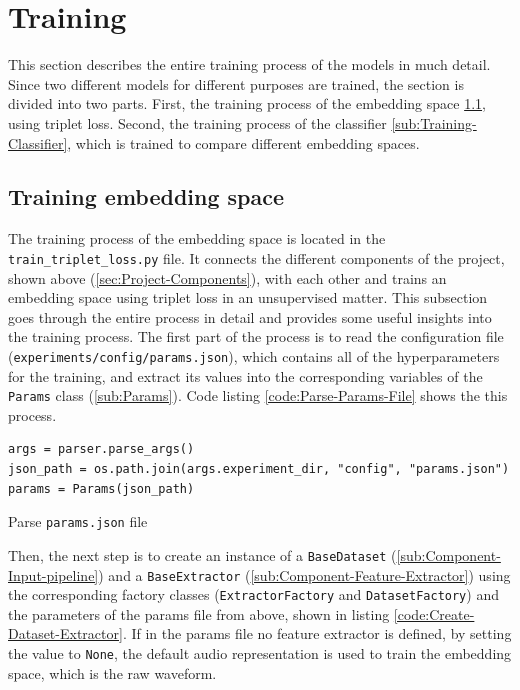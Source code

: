 \section{Training}
\label{sec:Training}
This section describes the entire training process of the models in much detail. Since two different models for different purposes are trained, the section is divided into two parts. First, the training process of the embedding space \ref{sub:Training-Embedding-Space}, using triplet loss. Second, the training process of the classifier \ref{sub:Training-Classifier}, which is trained to compare different embedding spaces.

\subsection{Training embedding space}
\label{sub:Training-Embedding-Space}
The training process of the embedding space is located in the \texttt{train\_triplet\_loss.py} file. It connects the different components of the project, shown above (\ref{sec:Project-Components}), with each other and trains an embedding space using triplet loss in an unsupervised matter. This subsection goes through the entire process in detail and provides some useful insights into the training process.
\newline
\newline
The first part of the process is to read the configuration file (\texttt{experiments/config/params.json}), which contains all of the hyperparameters for the training, and extract its values into the corresponding variables of the \texttt{Params} class (\ref{sub:Params}). Code listing \ref{code:Parse-Params-File} shows the this process.

\begin{code}[H]
\begin{verbatim}
args = parser.parse_args()
json_path = os.path.join(args.experiment_dir, "config", "params.json")
params = Params(json_path)
\end{verbatim}
\caption{Parse \texttt{params.json} file}
\label{code:Parse-Params-File}
\end{code}
\noindent
Then, the next step is to create an instance of a \texttt{BaseDataset} (\ref{sub:Component-Input-pipeline}) and a \texttt{BaseExtractor} (\ref{sub:Component-Feature-Extractor}) using the corresponding factory classes (\texttt{ExtractorFactory} and \texttt{DatasetFactory}) and the parameters of the params file from above, shown in listing \ref{code:Create-Dataset-Extractor}. If in the params file no feature extractor is defined, by setting the value to \texttt{None}, the default audio representation is used to train the embedding space, which is the raw waveform.

